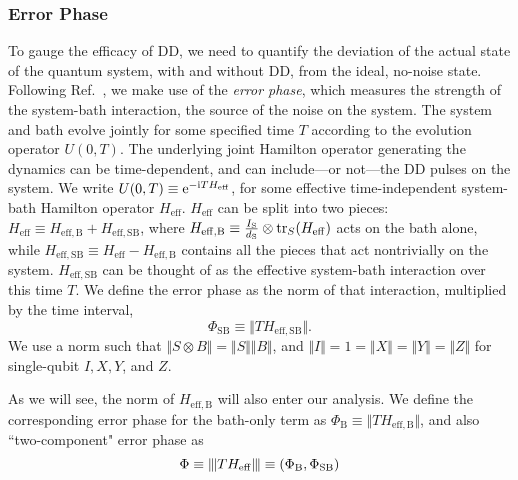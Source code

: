 \documentclass[pra,reprint,superscriptaddress]{revtex4-2}
\newcommand{\Heff}{H_\mathrm{eff}}
\newcommand{\HeffB}{H_\mathrm{eff,B}}
\newcommand{\HeffSB}{H_\mathrm{eff,SB}}
\newcommand{\ep}{\Phi_\mathrm{SB}}
\newcommand{\epB}{\Phi_\mathrm{B}}
\begin{document}
\subsubsection{Error Phase}
To gauge the efficacy of DD, we need to quantify the deviation of the actual state of the quantum system, with and without DD, from the ideal, no-noise state. Following Ref.~\cite{khodjasteh2007performance}, we make use of the \emph{error phase}, which measures the strength of the system-bath interaction, the source of the noise on the system. The system and bath evolve jointly for some specified time $T$ according to the evolution operator $U(0,T)$. The underlying joint Hamilton operator generating the dynamics can be time-dependent, and can include---or not---the DD pulses on the system. We write $U(0,T)\equiv \upe^{-\upi T\Heff}$, for some effective time-independent system-bath Hamilton operator $\Heff$. $\Heff$ can be split into two pieces: $\Heff\equiv \HeffB+\HeffSB$, where $\HeffB\equiv \frac{I_\mathrm{S}}{d_\mathrm{S}}\otimes\tr_S(\Heff)$ acts on the bath alone, while $\HeffSB\equiv \Heff-\HeffB$ contains all the pieces that act nontrivially on the system. $\HeffSB$ can be thought of as the effective system-bath interaction over this time $T$. We define the error phase as the norm of that interaction, multiplied by the time interval,
\begin{equation}\label{eq:ErrorPhase}
\ep\equiv \Vert T \HeffSB\Vert .
\end{equation}
We use a norm such that $\Vert S\otimes B\Vert = \Vert S\Vert \Vert B\Vert$, and $\Vert I\Vert =1=\Vert X\Vert = \Vert Y \Vert =\Vert Z\Vert$ for single-qubit $I, X, Y$, and $Z$.

As we will see, the norm of $\HeffB$ will also enter our analysis. We define the corresponding error phase for the bath-only term as $\epB\equiv \Vert T\HeffB\Vert $, and also ``two-component" error phase as
\begin{equation}
\Phi\equiv \opnorm{T \Heff}\equiv (\epB,\ep)
\end{equation}
\end{document}
